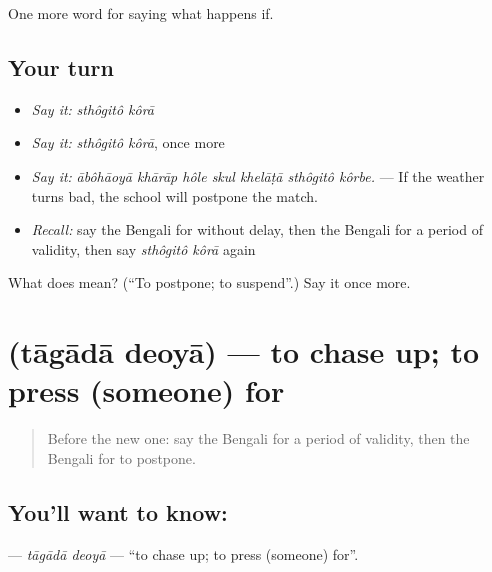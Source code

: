 \begin{grammarlens}[title={What you've built}]
One more word for saying what happens if.
\end{grammarlens}

\subsection*{Your turn}
\begin{itemize}
\raggedright
  \item \emph{Say it:} \emph{sthôgitô kôrā}
  \item \emph{Say it:} \emph{sthôgitô kôrā}, once more
  \item \emph{Say it:} \emph{ābôhāoyā khārāp hôle skul khelāṭā sthôgitô kôrbe.} — If the weather turns bad, the school will postpone the match.
  \item \emph{Recall:} say the Bengali for without delay, then the Bengali for a period of validity, then say \emph{sthôgitô kôrā} again
\end{itemize}

\begin{tcolorbox}[breakable,colback=teal!4,colframe=teal!35!black,title={Before you move on}]
What does   mean? (\textquotedblleft{}To postpone; to suspend\textquotedblright{}.) Say it once more.
\end{tcolorbox}
\section[\texorpdfstring{\bn{তাগাদা} \bn{দেওয়া} (tāgādā deoyā)}{তাগাদা দেওয়া (tāgādā deoyā)}]{  (tāgādā deoyā) — to chase up; to press (someone) for}

\label{lesson:BN-C378-tagada-deoya}



\begin{quote}
Before the new one: say the Bengali for a period of validity, then the Bengali for to postpone.
\end{quote}

\subsection*{You'll want to know:  }
\textbf{ } — \emph{tāgādā deoyā} — \textquotedblleft{}to chase up; to press (someone) for\textquotedblright{}.

\begin{quote}
     
\end{quote}


